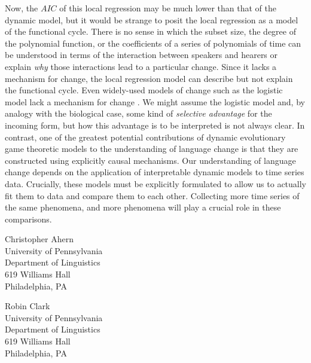 \documentclass[linguex]{sp}
\theoremstyle{definition} \newtheorem{definition}{Definition}
\begin{document}
Now, the $AIC$ of this local regression may be much lower than that of the dynamic model, but it would be strange to posit the local regression as a model of the functional cycle. There is no sense in which the subset size, the degree of the polynomial function, or the coefficients of a series of polynomials of time can be understood in terms of the interaction between speakers and hearers or explain \emph{why} those interactions lead to a particular change.  Since it lacks a mechanism for change, the local regression model can describe but not explain the functional cycle. Even widely-used models of change such as the logistic model lack a mechanism for change \citep[4]{kroch1989}. We might assume the logistic model and, by analogy with the biological case, some kind of \emph{selective advantage} for the incoming form, but how this advantage is to be interpreted is not always clear.  In contrast, one of the greatest potential contributions of dynamic evolutionary game theoretic models to the understanding of language change is that they are constructed using explicitly causal mechanisms. Our understanding of language change depends on the application of interpretable dynamic models to time series data. Crucially, these models must be explicitly formulated to allow us to actually fit them to data and compare them to each other. Collecting more time series of the same phenomena, and more phenomena will play a crucial role in these comparisons.





\begin{addresses}
  \begin{address}
    Christopher Ahern \\
    University of Pennsylvania\\
    Department of Linguistics\\
    619 Williams Hall \\
    Philadelphia, PA \\
  \end{address}
  \begin{address}
    Robin Clark \\
    University of Pennsylvania\\
    Department of Linguistics\\
    619 Williams Hall \\
    Philadelphia, PA\\
  \end{address}
\end{addresses}
\end{document}
